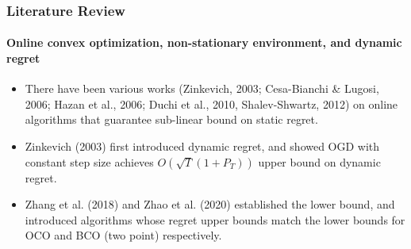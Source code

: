 \documentclass{beamer}
\begin{document}
    \begin{frame}
        \frametitle{Literature Review}
        \framesubtitle{Online convex optimization, non-stationary environment, and dynamic regret}
        \begin{itemize}
            \item There have been various works (Zinkevich, 2003; Cesa-Bianchi \& Lugosi, 2006; Hazan et al., 2006; Duchi et al., 2010, Shalev-Shwartz, 2012) on online algorithms that guarantee sub-linear bound on static regret.
            \item Zinkevich (2003) first introduced dynamic regret, and showed OGD with constant step size achieves $O(\sqrt{T}(1+P_T))$ upper bound on dynamic regret.
            \item Zhang et al. (2018) and Zhao et al. (2020) established the lower bound, and introduced algorithms whose regret upper bounds match the lower bounds for OCO and BCO (two point) respectively.
        \end{itemize}    
    \end{frame}
\end{document}
